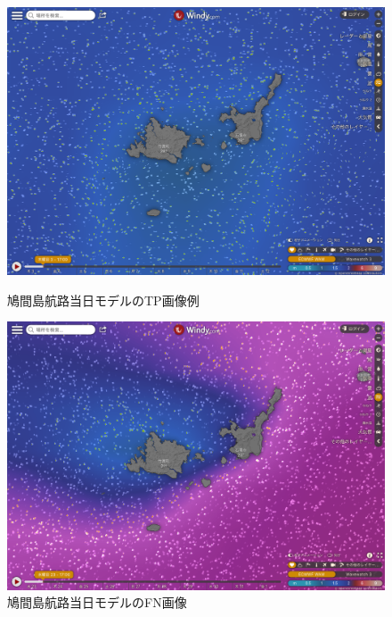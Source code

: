 \begin{figure}[htbp]
 \begin{minipage}{0.5\hsize}
  \begin{center}
   \includegraphics[keepaspectratio, scale=0.16]{fig/chapter4/wave_hatoma_0/TP.png}
  \end{center}
  \caption{鳩間島航路当日モデルのTP画像例}
  \label{hatoma_0_TP}
 \end{minipage}
 \begin{minipage}{0.5\hsize}
  \begin{center}
  \includegraphics[keepaspectratio, scale=0.16]{fig/chapter4/wave_hatoma_0/FN.png}
  \end{center}
   \caption{鳩間島航路当日モデルのFN画像}
  \label{hatoma_0_FN}
 \end{minipage}
\end{figure}

